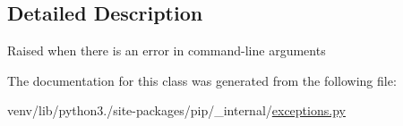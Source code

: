 \subsection{Detailed Description}
\begin{DoxyVerb}Raised when there is an error in command-line arguments\end{DoxyVerb}
 

The documentation for this class was generated from the following file\+:\begin{DoxyCompactItemize}
\item 
venv/lib/python3./site-\/packages/pip/\+\_\+internal/\hyperlink{pip_2__internal_2exceptions_8py}{exceptions.\+py}\end{DoxyCompactItemize}
